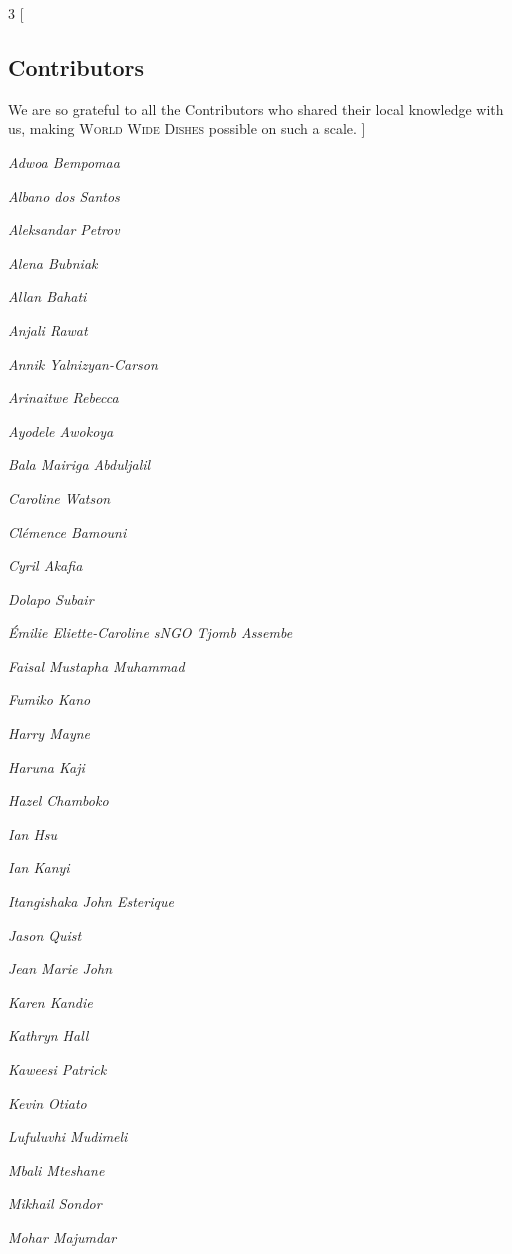 \begin{multicols}{3}
[
\subsection{Contributors}
We are so grateful to all the Contributors who shared their local knowledge with us, making \textsc{World Wide Dishes} possible on such a scale. 
]

\textit{Adwoa Bempomaa}

\textit{Albano dos Santos} 

\textit{Aleksandar Petrov} 

\textit{Alena Bubniak} 

\textit{Allan Bahati} 

\textit{Anjali Rawat}

\textit{Annik Yalnizyan-Carson}

\textit{Arinaitwe Rebecca}

\textit{Ayodele Awokoya}

\textit{Bala Mairiga Abduljalil} 

\textit{Caroline Watson} 

\textit{Clémence Bamouni} 

\textit{Cyril Akafia}

\textit{Dolapo Subair}

\textit{Émilie Eliette-Caroline sNGO Tjomb Assembe}

\textit{Faisal Mustapha Muhammad} 

\textit{Fumiko Kano}

\textit{Harry Mayne}

\textit{Haruna Kaji}

\textit{Hazel Chamboko}

\textit{Ian Hsu} 

\textit{Ian Kanyi} 

\textit{Itangishaka John Esterique} 

\textit{Jason Quist}

\textit{Jean Marie John}

\textit{Karen Kandie} 

\textit{Kathryn Hall}

\textit{Kaweesi Patrick} 

\textit{Kevin Otiato} 

\textit{Lufuluvhi Mudimeli} 

\textit{Mbali Mteshane} 

\textit{Mikhail Sondor}

\textit{Mohar Majumdar} 


\end{multicols}
